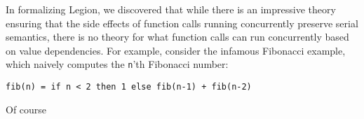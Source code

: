\documentclass[sigconf]{acmart}
\begin{document}
In formalizing Legion, we discovered that while there is an impressive theory
ensuring that the side effects of function calls running concurrently preserve
serial semantics, there is no theory for what function calls can run
concurrently based on value dependencies. For example, consider the infamous
Fibonacci example, which naively computes the \texttt{n}'th Fibonacci number: 

\begin{lstlisting}
fib(n) = if n < 2 then 1 else fib(n-1) + fib(n-2)
\end{lstlisting}
 
Of course 
\end{document}
